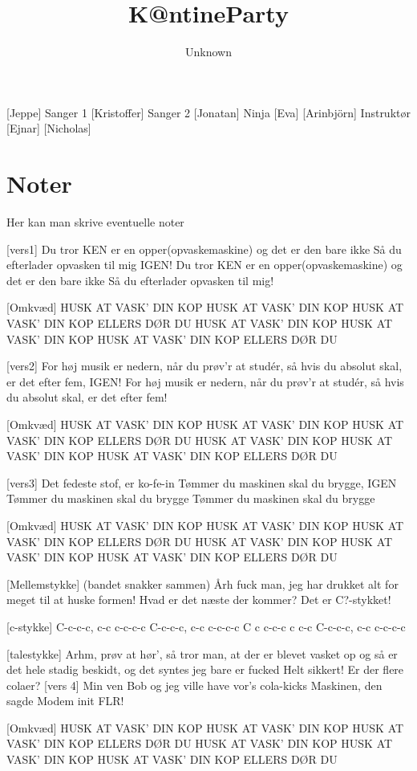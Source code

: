 \documentclass[a4paper,11pt]{article}
\title{K@ntineParty}
\author{Unknown}
\begin{document}
\maketitle

\begin{roles}
[Jeppe] Sanger 1
[Kristoffer] Sanger 2
[Jonatan] Ninja
[Eva]
[Arinbjörn] Instruktør
[Ejnar]
[Nicholas]

\end{roles} 

\section*{Noter}
Her kan man skrive eventuelle noter 

\begin{props}
\prop{}
\prop{}
\prop{}
\prop{}
\prop{}
\prop{}
\end{props}



\begin{song}
[vers1]
Du tror KEN er en opper(opvaskemaskine)
og det er den bare ikke
Så du efterlader opvasken til mig IGEN!
Du tror KEN er en opper(opvaskemaskine)
og det er den bare ikke
Så du efterlader opvasken til mig!

[Omkvæd]
HUSK AT VASK’ DIN KOP
HUSK AT VASK’ DIN KOP
HUSK AT VASK’ DIN KOP
ELLERS DØR DU
HUSK AT VASK’ DIN KOP
HUSK AT VASK’ DIN KOP
HUSK AT VASK’ DIN KOP
ELLERS DØR DU

[vers2]
For høj musik er nedern,
når du prøv’r at studér,
så hvis du absolut skal,
er det efter fem, IGEN!
For høj musik er nedern,
når du prøv’r at studér,
så hvis du absolut skal,
er det efter fem!

[Omkvæd]
HUSK AT VASK’ DIN KOP
HUSK AT VASK’ DIN KOP
HUSK AT VASK’ DIN KOP
ELLERS DØR DU
HUSK AT VASK’ DIN KOP
HUSK AT VASK’ DIN KOP
HUSK AT VASK’ DIN KOP
ELLERS DØR DU

[vers3]
Det fedeste stof, er ko-fe-in
Tømmer du maskinen
skal du brygge, IGEN
Tømmer du maskinen
skal du brygge
Tømmer du maskinen
skal du brygge

[Omkvæd]
HUSK AT VASK’ DIN KOP
HUSK AT VASK’ DIN KOP
HUSK AT VASK’ DIN KOP
ELLERS DØR DU
HUSK AT VASK’ DIN KOP
HUSK AT VASK’ DIN KOP
HUSK AT VASK’ DIN KOP
ELLERS DØR DU

[Mellemstykke] (bandet snakker sammen)
Årh fuck man, jeg har drukket alt for meget til at huske formen! Hvad er det næste der
kommer?
Det er C?-stykket!

[c-stykke]
C-c-c-c, c-c c-c-c-c
C-c-c-c, c-c c-c-c-c
C c c-c-c c c-c
C-c-c-c, c-c c-c-c-c

[talestykke]
Arhm, prøv at hør’, så tror man, at der er blevet vasket op og så er det hele stadig beskidt,
og det syntes jeg bare er fucked
Helt sikkert! Er der flere colaer?
[vers 4]
Min ven Bob og jeg
ville have vor’s cola-kicks
Maskinen, den sagde
Modem init FLR!

[Omkvæd]
HUSK AT VASK’ DIN KOP
HUSK AT VASK’ DIN KOP
HUSK AT VASK’ DIN KOP
ELLERS DØR DU
HUSK AT VASK’ DIN KOP
HUSK AT VASK’ DIN KOP
HUSK AT VASK’ DIN KOP
ELLERS DØR DU
\end{song}
\end{document}
